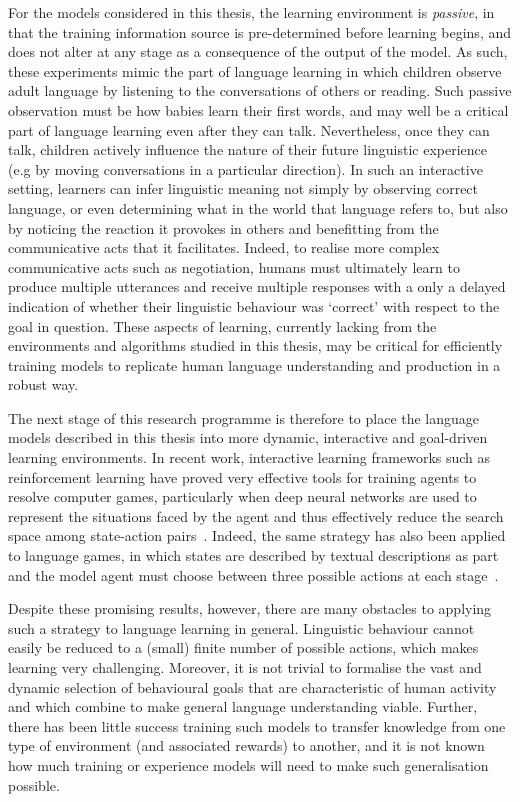 For the models considered in this thesis, the learning environment is \emph{passive}, in that the training information source is pre-determined before learning begins, and does not alter at any stage as a consequence of the output of the model. As such, these experiments mimic the part of language learning in which children observe adult language by listening to the conversations of others or reading. Such passive observation must be how babies learn their first words, and may well be a critical part of language learning even after they can talk. Nevertheless, once they can talk, children actively influence the nature of their future linguistic experience (e.g by moving conversations in a particular direction). In such an interactive setting, learners can infer linguistic meaning not simply by observing correct language, or even determining what in the world that language refers to, but also by noticing the reaction it provokes in others and benefitting from the communicative acts that it facilitates. Indeed, to realise more complex communicative acts such as negotiation, humans must ultimately learn to produce multiple utterances and receive multiple responses with a only a delayed indication of whether their linguistic behaviour was `correct' with respect to the goal in question. These aspects of learning, currently lacking from the environments and algorithms studied in this thesis, may be critical for efficiently training models to replicate human language understanding and production in a robust way.

The next stage of this research programme is therefore to place the language models described in this thesis into more dynamic, interactive and goal-driven learning environments. In recent work, interactive learning frameworks such as reinforcement learning have proved very effective tools for training agents to resolve computer games, particularly when deep neural networks are used to represent the situations faced by the agent and thus effectively reduce the search space among state-action pairs~\citep{mnih2015human}. Indeed, the same strategy has also been applied to language games, in which states are described by textual descriptions as part and the model agent must choose between three possible actions at each stage~\citep{narasimhan2015language}. 

Despite these promising results, however, there are many obstacles to applying such a strategy to language learning in general. Linguistic behaviour cannot easily be reduced to a (small) finite number of possible actions, which makes learning very challenging. Moreover, it is not trivial to formalise the vast and dynamic selection of behavioural goals that are characteristic of human activity and which combine to make general language understanding viable. Further, there has been little success training such models to transfer knowledge from one type of environment (and associated rewards) to another, and it is not known how much training or experience models will need to make such generalisation possible. 

